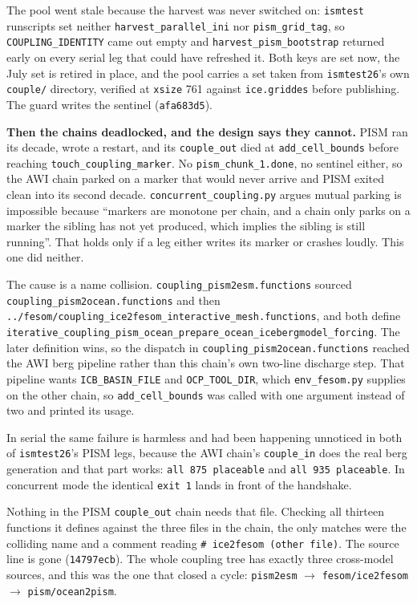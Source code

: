 \documentclass[11pt,a4paper]{article}
\newcommand{\code}[1]{\texttt{\small #1}}
\begin{document}
The pool went stale because the harvest was never switched on: \code{ismtest} runscripts set
neither \code{harvest\_parallel\_ini} nor \code{pism\_grid\_tag}, so \code{COUPLING\_IDENTITY} came
out empty and \code{harvest\_pism\_bootstrap} returned early on every serial leg that could have
refreshed it. Both keys are set now, the July set is retired in place, and the pool carries a set
taken from \code{ismtest26}'s own \code{couple/} directory, verified at \code{xsize} 761 against
\code{ice.griddes} before publishing. The guard writes the sentinel (\code{afa683d5}).

\medskip\noindent
\textbf{Then the chains deadlocked, and the design says they cannot.} PISM ran its decade, wrote a
restart, and its \code{couple\_out} died at \code{add\_cell\_bounds} before reaching
\code{touch\_coupling\_marker}. No \code{pism\_chunk\_1.done}, no sentinel either, so the AWI chain
parked on a marker that would never arrive and PISM exited clean into its second decade.
\code{concurrent\_coupling.py} argues mutual parking is impossible because ``markers are monotone
per chain, and a chain only parks on a marker the sibling has not yet produced, which implies the
sibling is still running''. That holds only if a leg either writes its marker or crashes loudly.
This one did neither.

The cause is a name collision. \code{coupling\_pism2esm.functions} sourced
\code{coupling\_pism2ocean.functions} and then
\code{../fesom/coupling\_ice2fesom\_interactive\_mesh.functions}, and both define
\code{iterative\_coupling\_pism\_ocean\_prepare\_ocean\_icebergmodel\_forcing}. The later
definition wins, so the dispatch in \code{coupling\_pism2ocean.functions} reached the AWI berg
pipeline rather than this chain's own two-line discharge step. That pipeline wants
\code{ICB\_BASIN\_FILE} and \code{OCP\_TOOL\_DIR}, which \code{env\_fesom.py} supplies on the other
chain, so \code{add\_cell\_bounds} was called with one argument instead of two and printed its
usage.

In serial the same failure is harmless and had been happening unnoticed in both of
\code{ismtest26}'s PISM legs, because the AWI chain's \code{couple\_in} does the real berg
generation and that part works: \code{all 875 placeable} and \code{all 935 placeable}. In
concurrent mode the identical \code{exit 1} lands in front of the handshake.

Nothing in the PISM \code{couple\_out} chain needs that file. Checking all thirteen functions it
defines against the three files in the chain, the only matches were the colliding name and a
comment reading \code{\# ice2fesom (other file)}. The source line is gone (\code{14797ecb}). The
whole coupling tree has exactly three cross-model sources, and this was the one that closed a
cycle: \code{pism2esm} $\to$ \code{fesom/ice2fesom} $\to$ \code{pism/ocean2pism}.
\end{document}
